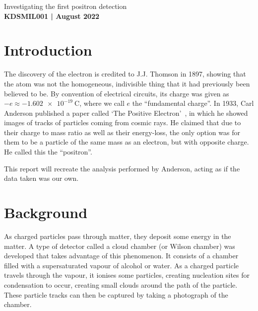 \documentclass[11pt]{article}
\numberwithin{equation}{section}
\numberwithin{figure}{section}
\numberwithin{table}{section}
\begin{document}
\begin{center}
    {\huge Investigating the first positron detection}\\
    \vspace{0.2in}
    \textbf{KDSMIL001 | August 2022}
    
    \begin{abstract}
        The first image of a positron track in a cloud chamber is analysed in a similar way to the original paper, with more of an emphasis on the physical processes taking place as the positron travels through the chamber.
    \end{abstract}
\end{center}

\section{Introduction}\label{sec:Introduction}
The discovery of the electron is credited to J.J. Thomson in 1897, showing that the atom was not the homogeneous, indivisible thing that it had previously been believed to be. By convention of electrical circuits, its charge was given as $-e\approx-\SI{1.602e-19}{\coulomb}$, where we call $e$ the ``fundamental charge''. In 1933, Carl Anderson published a paper called `The Positive Electron'~\cite{Pos_Electron}, in which he showed images of tracks of particles coming from cosmic rays. He claimed that due to their charge to mass ratio as well as their energy-loss, the only option was for them to be a particle of the same mass as an electron, but with opposite charge. He called this the ``positron''. 

This report will recreate the analysis performed by Anderson, acting as if the data taken was our own.

\section{Background}\label{sec:Background}
As charged particles pass through matter, they deposit some energy in the matter. A type of detector called a cloud chamber (or Wilson chamber) was developed that takes advantage of this phenomenon. It consists of a chamber filled with a supersaturated vapour of alcohol or water. As a charged particle travels through the vapour, it ionises some particles, creating nucleation sites for condensation to occur, creating small clouds around the path of the particle. These particle tracks can then be captured by taking a photograph of the chamber.
\end{document}
